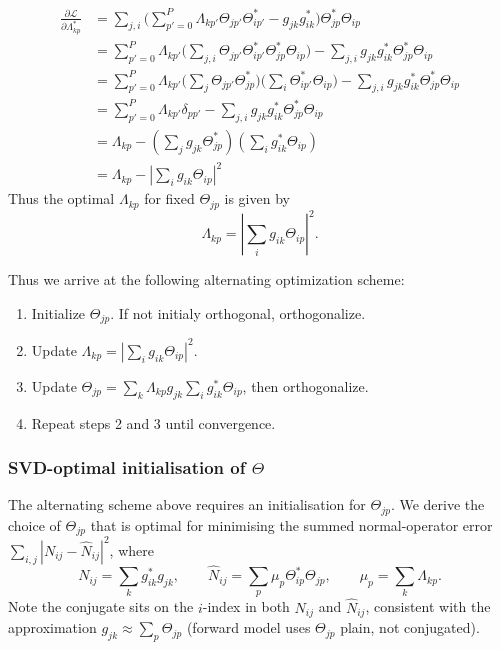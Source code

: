 \documentclass{article}
\begin{document}
\begin{equation}
\begin{split}
    \frac{\partial \mathcal{L}}{\partial \Lambda_{kp}^*} 
    &= \sum_{j,i}\bigg(\sum_{p'=0}^P \Lambda_{kp'} \Theta_{jp'} \Theta^*_{ip'} - g_{jk} g^*_{ik}\bigg)\Theta_{jp}^* \Theta_{ip} 
    \\
    &= \sum_{p'=0}^P \Lambda_{kp'} \bigg(\sum_{j,i} \Theta_{jp'} \Theta^*_{ip'} \Theta_{jp}^* \Theta_{ip}\bigg) - \sum_{j,i} g_{jk} g^*_{ik} \Theta_{jp}^* \Theta_{ip} 
    \\
    &= \sum_{p'=0}^P \Lambda_{kp'} \bigg(\sum_j \Theta_{jp'} \Theta_{jp}^*\bigg)\bigg(\sum_i \Theta^*_{ip'} \Theta_{ip}\bigg) - \sum_{j,i} g_{jk} g^*_{ik} \Theta_{jp}^* \Theta_{ip} 
    \\
    &= \sum_{p'=0}^P \Lambda_{kp'} \delta_{pp'} - \sum_{j,i} g_{jk} g^*_{ik} \Theta_{jp}^* \Theta_{ip} 
    \\
    &= \Lambda_{kp} - (\sum_j g_{jk} \Theta_{jp}^*)(\sum_ig^*_{ik} \Theta_{ip}) 
    \\
    &= \Lambda_{kp} - |\sum_i g_{ik} \Theta_{ip}|^2
\end{split}
\end{equation}
Thus the optimal $\Lambda_{kp}$ for fixed $\Theta_{jp}$ is given by
\begin{equation}
    \Lambda_{kp} = |\sum_i g_{ik} \Theta_{ip}|^2.
\end{equation}

Thus we arrive at the following alternating optimization scheme:
\begin{enumerate}[label=\arabic*.]
    \item Initialize $\Theta_{jp}$. If not initialy orthogonal, orthogonalize.
    \item Update $\Lambda_{kp} = |\sum_i g_{ik} \Theta_{ip}|^2$.
    \item Update $\Theta_{jp} = \sum_k \Lambda_{kp} g_{jk} \sum_i g^*_{ik} \Theta_{ip}$, then orthogonalize.
    \item Repeat steps 2 and 3 until convergence.
\end{enumerate}




\subsubsection{SVD-optimal initialisation of $\Theta$}
\label{sec:svd_init}

The alternating scheme above requires an initialisation for $\Theta_{jp}$.
We derive the choice of $\Theta_{jp}$ that is optimal for minimising the
summed normal-operator error $\sum_{i,j}|N_{ij} - \hat{N}_{ij}|^2$, where
\begin{equation}
    N_{ij} = \sum_k g^*_{ik} g_{jk}, \qquad
    \hat{N}_{ij} = \sum_p \mu_p \Theta^*_{ip} \Theta_{jp},
    \qquad \mu_p = \sum_k \Lambda_{kp}.
\end{equation}
Note the conjugate sits on the $i$-index in both $N_{ij}$ and $\hat{N}_{ij}$,
consistent with the approximation $g_{jk} \approx \sum_p \Theta_{jp}$ (forward model
uses $\Theta_{jp}$ plain, not conjugated).
\end{document}
